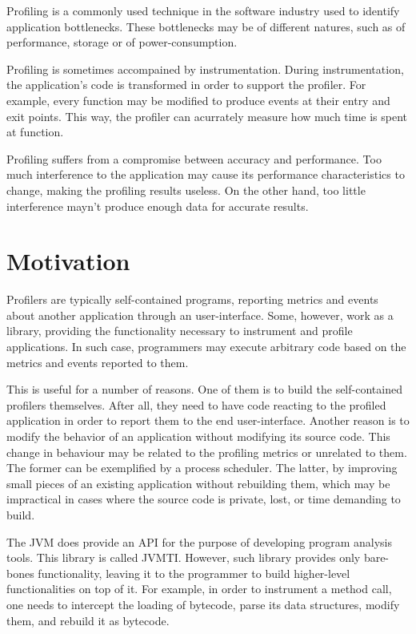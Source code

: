 
Profiling is a commonly used technique in the software industry used to identify application bottlenecks. These bottlenecks may be of different natures, such as of performance, storage or of power-consumption.

Profiling is sometimes accompained by instrumentation. During instrumentation, the application's code is transformed in order to support the profiler. For example, every function may be modified to produce events at their entry and exit points. This way, the profiler can acurrately measure how much time is spent at function.

Profiling suffers from a compromise between accuracy and performance. Too much interference to the application may cause its performance characteristics to change, making the profiling results useless. On the other hand, too little interference mayn't produce enough data for accurate results.


\section{Motivation}

Profilers are typically self-contained programs, reporting metrics and events about another application through an user-interface. Some, however, work as a library, providing the functionality necessary to instrument and profile applications. In such case, programmers may execute arbitrary code based on the metrics and events reported to them.

This is useful for a number of reasons. One of them is to build the self-contained profilers themselves. After all, they need to have code reacting to the profiled application in order to report them to the end user-interface. Another reason is to modify the behavior of an application without modifying its source code. This change in behaviour may be related to the profiling metrics or unrelated to them. The former can be exemplified by a process scheduler. The latter, by improving small pieces of an existing application without rebuilding them, which may be impractical in cases where the source code is private, lost, or time demanding to build.

The JVM does provide an API for the purpose of developing program analysis tools. This library is called JVMTI. However, such library provides only bare-bones functionality, leaving it to the programmer to build higher-level functionalities on top of it. For example, in order to instrument a method call, one needs to intercept the loading of bytecode, parse its data structures, modify them, and rebuild it as bytecode.

